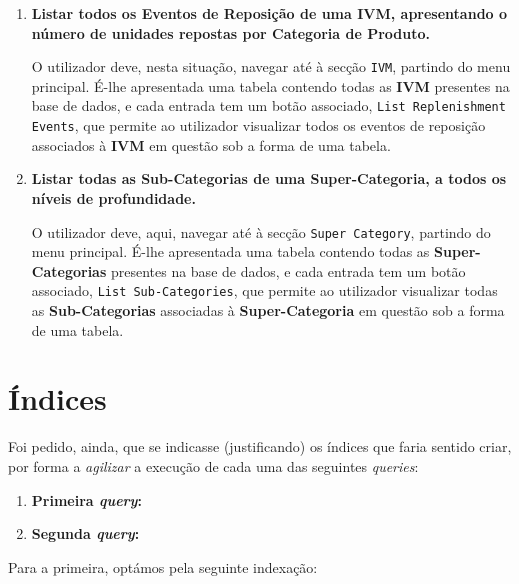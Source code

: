 \documentclass[12pt,a4paper]{article}
\begin{document}
\begin{enumerate}
    \item \textbf{Listar todos os Eventos de Reposição de uma IVM, apresentando
    o número de unidades repostas por Categoria de Produto.}

    O utilizador deve, nesta situação, navegar até à secção \texttt{IVM},
    partindo do menu principal. É-lhe apresentada uma tabela contendo todas as
    \textbf{IVM} presentes na base de dados, e cada entrada tem um botão
    associado, \texttt{List Replenishment Events}, que permite ao utilizador
    visualizar todos os eventos de reposição associados à \textbf{IVM} em questão
    sob a forma de uma tabela.
    
    \item \textbf{Listar todas as Sub-Categorias de uma Super-Categoria, a todos
    os níveis de profundidade.}

    O utilizador deve, aqui, navegar até à secção \texttt{Super Category},
    partindo do menu principal. É-lhe apresentada uma tabela contendo todas as
    \textbf{Super-Categorias} presentes na base de dados, e cada entrada tem um
    botão associado, \texttt{List Sub-Categories}, que permite ao utilizador
    visualizar todas as \textbf{Sub-Categorias} associadas à \textbf{Super-Categoria}
    em questão sob a forma de uma tabela.

  \end{enumerate}


  \section*{Índices}

  Foi pedido, ainda, que se indicasse (justificando) os índices que faria sentido
  criar, por forma a \textit{agilizar} a execução de cada uma das seguintes \textit{queries}:

  \begin{enumerate}
    \item \textbf{Primeira \textit{query}:}
    
    

    \item \textbf{Segunda \textit{query}:}
  
    
  \end{enumerate}
  
  Para a primeira, optámos pela seguinte indexação:
\end{document}
